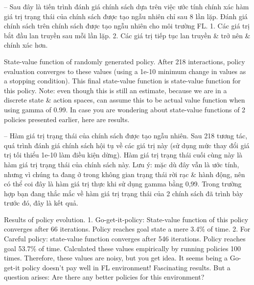 \documentclass{article}
\begin{document}
\begin{itemize}
\begin{itemize}
\begin{itemize}
            -- Sau đây là tiến trình đánh giá chính sách dựa trên việc ước tính chính xác hàm giá trị trạng thái của chính sách được tạo ngẫu nhiên chỉ sau 8 lần lặp. {\sf Đánh giá chính sách trên chính sách được tạo ngẫu nhiên cho môi trường FL.} 1. Các giá trị bắt đầu lan truyền sau mỗi lần lặp. 2. Các giá trị tiếp tục lan truyền \& trở nên \& chính xác hơn.

            {\sf State-value function of randomly generated policy.} After 218 interactions, policy evaluation converges to these values (using a 1e-10 minimum change in values as a stopping condition). This final state-value function is state-value function for this policy. Note: even though this is still an estimate, because we are in a discrete state \& action spaces, can assume this to be actual value function when using gamma of 0.99. In case you are wondering about state-value functions of 2 policies presented earlier, here are results.

            -- {\sf Hàm giá trị trạng thái của chính sách được tạo ngẫu nhiên.} Sau 218 tương tác, quá trình đánh giá chính sách hội tụ về các giá trị này (sử dụng mức thay đổi giá trị tối thiểu 1e-10 làm điều kiện dừng). Hàm giá trị trạng thái cuối cùng này là hàm giá trị trạng thái của chính sách này. Lưu ý: mặc dù đây vẫn là ước tính, nhưng vì chúng ta đang ở trong không gian trạng thái rời rạc \& hành động, nên có thể coi đây là hàm giá trị thực khi sử dụng gamma bằng 0,99. Trong trường hợp bạn đang thắc mắc về hàm giá trị trạng thái của 2 chính sách đã trình bày trước đó, đây là kết quả.

            {\sf Results of policy evolution.} 1. Go-get-it-policy: State-value function of this policy converges after 66 iterations. Policy reaches goal state a mere 3.4\% of time. 2. For Careful policy: state-value function converges after 546 iterations. Policy reaches goal 53.7\% of time. Calculated these values empirically by running policies 100 times. Therefore, these values are noisy, but you get idea. It seems being a Go-get-it policy doesn't pay well in FL environment! Fascinating results. But a question arises: Are there any better policies for this environment?


\end{itemize}
\end{itemize}
\end{itemize}
\end{document}
